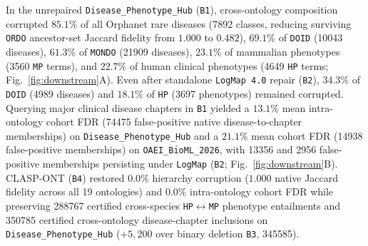 \documentclass[10pt]{article}
\theoremstyle{accentdef}
\newcommand{\ClaspDiseasePhenotypeHubBRawHubChapterFP}{74475}
\newcommand{\ClaspDiseasePhenotypeHubBRawHubDOIDCorruptedPct}{69.1}
\newcommand{\ClaspDiseasePhenotypeHubBRawHubDOIDCorruptedCnt}{10043}
\newcommand{\ClaspDiseasePhenotypeHubBRawHubHPCorruptedPct}{22.7}
\newcommand{\ClaspDiseasePhenotypeHubBRawHubHPCorruptedCnt}{4649}
\newcommand{\ClaspDiseasePhenotypeHubBRawHubMONDOCorruptedPct}{61.3}
\newcommand{\ClaspDiseasePhenotypeHubBRawHubMONDOCorruptedCnt}{21909}
\newcommand{\ClaspDiseasePhenotypeHubBRawHubMPCorruptedPct}{23.1}
\newcommand{\ClaspDiseasePhenotypeHubBRawHubMPCorruptedCnt}{3560}
\newcommand{\ClaspDiseasePhenotypeHubBRawHubORDOCorruptedPct}{85.1}
\newcommand{\ClaspDiseasePhenotypeHubBRawHubORDOCorruptedCnt}{7892}
\newcommand{\ClaspDiseasePhenotypeHubBRawHubORDOJaccard}{0.482}
\newcommand{\ClaspDiseasePhenotypeHubBLogMapRepairChapterFP}{13356}
\newcommand{\ClaspDiseasePhenotypeHubBLogMapRepairDOIDCorruptedPct}{34.3}
\newcommand{\ClaspDiseasePhenotypeHubBLogMapRepairDOIDCorruptedCnt}{4989}
\newcommand{\ClaspDiseasePhenotypeHubBLogMapRepairHPCorruptedPct}{18.1}
\newcommand{\ClaspDiseasePhenotypeHubBLogMapRepairHPCorruptedCnt}{3697}
\newcommand{\ClaspDiseasePhenotypeHubBLexicalLatticeHPMPPairs}{288767}
\newcommand{\ClaspDiseasePhenotypeHubBRawHubChapterFDRPct}{13.1}
\newcommand{\ClaspDiseasePhenotypeHubBASPBinaryDeleteChapterCross}{345585}
\newcommand{\ClaspDiseasePhenotypeHubBLexicalLatticeChapterCross}{350785}
\newcommand{\ClaspOAEIBioMLBRawHubChapterFP}{14938}
\newcommand{\ClaspOAEIBioMLBLogMapRepairChapterFP}{2956}
\newcommand{\ClaspOAEIBioMLBRawHubChapterFDRPct}{21.1}
\begin{document}
In the unrepaired \texttt{Disease\_Phenotype\_Hub} (\texttt{B1}), cross-ontology composition corrupted $\ClaspDiseasePhenotypeHubBRawHubORDOCorruptedPct{}\%$ of all Orphanet rare diseases (\num{\ClaspDiseasePhenotypeHubBRawHubORDOCorruptedCnt} classes, reducing surviving \texttt{ORDO} ancestor-set Jaccard fidelity from $1.000$ to $\ClaspDiseasePhenotypeHubBRawHubORDOJaccard{}$), $\ClaspDiseasePhenotypeHubBRawHubDOIDCorruptedPct{}\%$ of \texttt{DOID} (\num{\ClaspDiseasePhenotypeHubBRawHubDOIDCorruptedCnt} diseases), $\ClaspDiseasePhenotypeHubBRawHubMONDOCorruptedPct{}\%$ of \texttt{MONDO} (\num{\ClaspDiseasePhenotypeHubBRawHubMONDOCorruptedCnt} diseases), $\ClaspDiseasePhenotypeHubBRawHubMPCorruptedPct{}\%$ of mammalian phenotypes (\num{\ClaspDiseasePhenotypeHubBRawHubMPCorruptedCnt} \texttt{MP} terms), and $\ClaspDiseasePhenotypeHubBRawHubHPCorruptedPct{}\%$ of human clinical phenotypes (\num{\ClaspDiseasePhenotypeHubBRawHubHPCorruptedCnt} \texttt{HP} terms; Fig.~\ref{fig:downstream}A). Even after standalone \texttt{LogMap~4.0} repair (\texttt{B2}), $\ClaspDiseasePhenotypeHubBLogMapRepairDOIDCorruptedPct{}\%$ of \texttt{DOID} (\num{\ClaspDiseasePhenotypeHubBLogMapRepairDOIDCorruptedCnt} diseases) and $\ClaspDiseasePhenotypeHubBLogMapRepairHPCorruptedPct{}\%$ of \texttt{HP} (\num{\ClaspDiseasePhenotypeHubBLogMapRepairHPCorruptedCnt} phenotypes) remained corrupted. Querying major clinical disease chapters in \texttt{B1} yielded a $\ClaspDiseasePhenotypeHubBRawHubChapterFDRPct{}\%$ mean intra-ontology cohort FDR (\num{\ClaspDiseasePhenotypeHubBRawHubChapterFP} false-positive native disease-to-chapter memberships) on \texttt{Disease\_Phenotype\_Hub} and a $\ClaspOAEIBioMLBRawHubChapterFDRPct{}\%$ mean cohort FDR (\num{\ClaspOAEIBioMLBRawHubChapterFP} false-positive memberships) on \texttt{OAEI\_BioML\_2026}, with \num{\ClaspDiseasePhenotypeHubBLogMapRepairChapterFP} and \num{\ClaspOAEIBioMLBLogMapRepairChapterFP} false-positive memberships persisting under \texttt{LogMap} (\texttt{B2}; Fig.~\ref{fig:downstream}B). \textsc{CLASP-ONT} (\texttt{B4}) restored $0.0\%$ hierarchy corruption ($1.000$ native Jaccard fidelity across all 19 ontologies) and $0.0\%$ intra-ontology cohort FDR while preserving \num{\ClaspDiseasePhenotypeHubBLexicalLatticeHPMPPairs} certified cross-species \texttt{HP}$\leftrightarrow$\texttt{MP} phenotype entailments and \num{\ClaspDiseasePhenotypeHubBLexicalLatticeChapterCross} certified cross-ontology disease-chapter inclusions on \texttt{Disease\_Phenotype\_Hub} ($+5{,}200$ over binary deletion \texttt{B3}, \num{\ClaspDiseasePhenotypeHubBASPBinaryDeleteChapterCross}).
\end{document}
